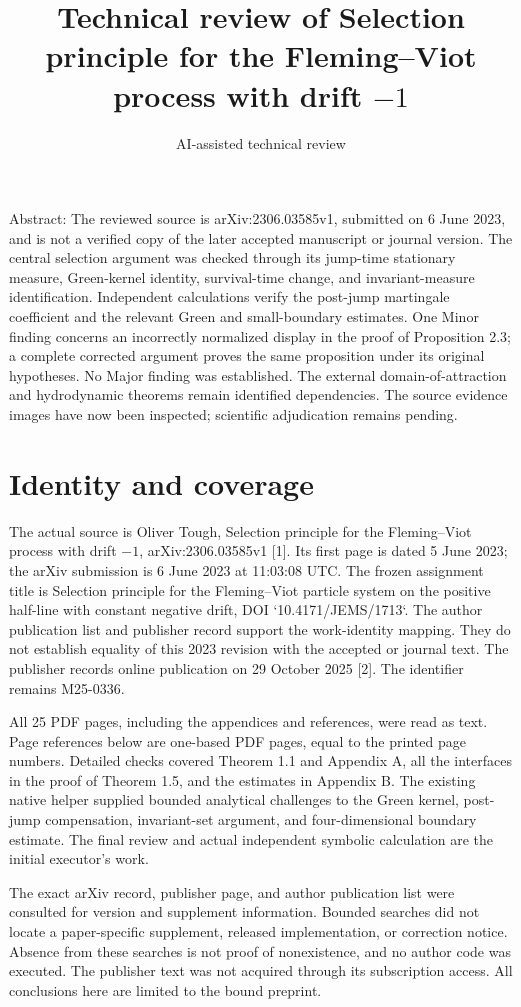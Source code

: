 \documentclass[10pt]{article}
\title{Technical review of
Selection principle for the Fleming–Viot process with drift \(-1\)}
\author{AI-assisted technical review}
\date{}
\begin{document}
\maketitle
Abstract: The reviewed source is arXiv:2306.03585v1, submitted on 6 June 2023, and is not a verified copy of the later accepted manuscript or journal version. The central selection argument was checked through its jump-time stationary measure, Green-kernel identity, survival-time change, and invariant-measure identification. Independent calculations verify the post-jump martingale coefficient and the relevant Green and small-boundary estimates. One Minor finding concerns an incorrectly normalized display in the proof of Proposition 2.3; a complete corrected argument proves the same proposition under its original hypotheses. No Major finding was established. The external domain-of-attraction and hydrodynamic theorems remain identified dependencies. The source evidence images have now been inspected; scientific adjudication remains pending.\par
\section*{Identity and coverage}
The actual source is Oliver Tough, Selection principle for the Fleming–Viot process with drift \(-1\), arXiv:2306.03585v1 [1]. Its first page is dated 5 June 2023; the arXiv submission is 6 June 2023 at 11:03:08 UTC. The frozen assignment title is Selection principle for the Fleming–Viot particle system on the positive half-line with constant negative drift, DOI `10.4171/JEMS/1713`. The author publication list and publisher record support the work-identity mapping. They do not establish equality of this 2023 revision with the accepted or journal text. The publisher records online publication on 29 October 2025 [2]. The identifier remains M25-0336.\par
All 25 PDF pages, including the appendices and references, were read as text. Page references below are one-based PDF pages, equal to the printed page numbers. Detailed checks covered Theorem 1.1 and Appendix A, all the interfaces in the proof of Theorem 1.5, and the estimates in Appendix B. The existing native helper supplied bounded analytical challenges to the Green kernel, post-jump compensation, invariant-set argument, and four-dimensional boundary estimate. The final review and actual independent symbolic calculation are the initial executor’s work.\par
The exact arXiv record, publisher page, and author publication list were consulted for version and supplement information. Bounded searches did not locate a paper-specific supplement, released implementation, or correction notice. Absence from these searches is not proof of nonexistence, and no author code was executed. The publisher text was not acquired through its subscription access. All conclusions here are limited to the bound preprint.\par
\end{document}
